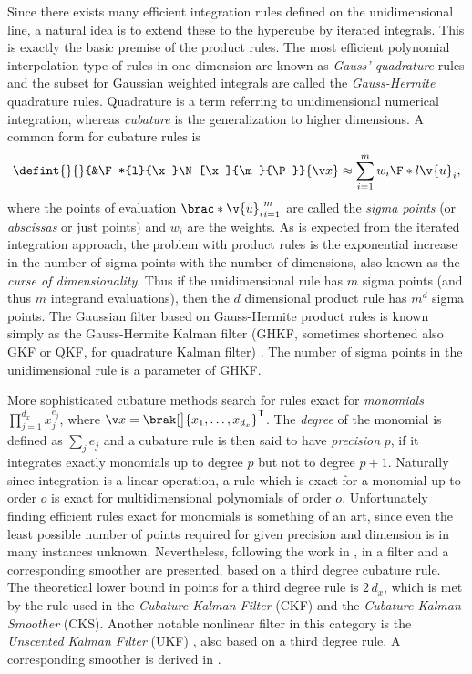 Since there exists many efficient integration rules defined on the unidimensional line,
a natural idea is to extend these to the hypercube by iterated integrals. This is exactly the 
basic premise of the product rules. The most efficient polynomial interpolation type of rules
in one dimension are known as \emph{Gauss' quadrature} rules and the subset
for Gaussian weighted integrals are called the \emph{Gauss-Hermite}
quadrature rules. Quadrature is a term referring to unidimensional numerical integration, whereas
\emph{cubature} is the generalization to higher dimensions. A common form for cubature rules is
\begin{align}
	\defint{}{}{&\F*{l}{\x}\N[\x]{\m}{\P}}{\x} \approx \sum_{i=1}^m w_i\F*{l}{\v{u}_i},
\end{align}
where the points of evaluation $\brac*{\v{u}_i}_{i=1}^m$ are called the \emph{sigma points}
(or \emph{abscissas} or just points) and $w_i$ are the weights. As is expected from the iterated integration approach,
the problem with product rules is the exponential increase in the number of sigma points with
the number of dimensions, also known as the \emph{curse of dimensionality}. Thus if the unidimensional rule has $m$ sigma points (and thus $m$ integrand evaluations),
then the $d$ dimensional product rule has $m^d$ sigma points. The Gaussian filter based
on Gauss-Hermite product rules is known simply as the Gauss-Hermite Kalman filter (GHKF, sometimes shortened also GKF or QKF, for quadrature Kalman filter) \parencite{Ito2000}.
The number of sigma points in the unidimensional rule is a parameter of GHKF.

More sophisticated cubature methods search for rules
exact for \emph{monomials} $\prod_{j=1}^{d_x} x_j^{e_j}$, where $\x=\brak[\big]{x_1,\dots,x_{d_x}}^\tr$. 
The \emph{degree} of the monomial is defined as $\sum_j e_j$ and a cubature rule is then said to have
\emph{precision} $p$, if it integrates exactly monomials up to degree $p$ but not
to degree $p+1$. Naturally since integration is a linear operation, a rule which is exact 
for a monomial up to order $o$ is exact for multidimensional polynomials of order $o$.
Unfortunately finding efficient rules exact for monomials is something of an art, since
even the least possible number of points required for given precision and dimension is in many
instances unknown. Nevertheless, following the work in \textcite{Wu2006}, in \textcite{Arasaratnam2009,Arasaratnam2011} a filter
and a corresponding smoother are presented, based on a third degree 
cubature rule. The theoretical lower bound in points for a third degree rule
is $2\,d_x$, which is met by the rule used in the \emph{Cubature Kalman Filter} (CKF)  and
the \emph{Cubature Kalman Smoother} (CKS). Another notable nonlinear filter in this
category is the \emph{Unscented Kalman Filter} (UKF) \parencite{julier1997new,Merwe2004}, 
also based on a third degree rule. A corresponding smoother is derived in \textcite{Sarkka2008a}.


